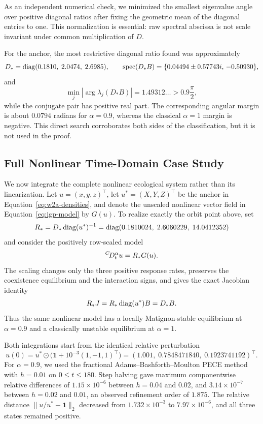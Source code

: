 As an independent numerical check, we minimized the smallest eigenvalue angle over positive diagonal ratios after fixing the geometric mean of the diagonal entries to one. This normalization is essential: raw spectral abscissa is not scale invariant under common multiplication of \(D\).

For the anchor, the most restrictive diagonal ratio found was approximately
\[
 D_*=\operatorname{diag}(0.1810,\;2.0474,\;2.6985),
 \qquad
 \operatorname{spec}(D_*B)=\{0.04494\pm0.57743i,\,-0.50930\},
\]
and
\[
 \min_j|\arg\lambda_j(D_*B)|=1.49312\ldots>0.9\frac{\pi}{2},
\]
while the conjugate pair has positive real part. The corresponding angular margin is about \(0.0794\) radians for \(\alpha=0.9\), whereas the classical \(\alpha=1\) margin is negative. This direct search corroborates both sides of the classification, but it is not used in the proof.

\subsection{Full Nonlinear Time-Domain Case Study}

We now integrate the complete nonlinear ecological system rather than its linearization. Let \(u=(x,y,z)^\top\), let \(u^*=(X,Y,Z)^\top\) be the anchor in Equation~\eqref{eq:w2a-densities}, and denote the unscaled nonlinear vector field in Equation~\eqref{eq:igp-model} by \(G(u)\). To realize exactly the orbit point above, set
\begin{equation}
 R_*=D_*\operatorname{diag}(u^*)^{-1}
 =\operatorname{diag}(0.1810024,\;2.6060229,\;14.0412352)
 \label{eq:row-rate-scaling}
\end{equation}
and consider the positively row-scaled model
\begin{equation}
 {}^{C}\!D_t^{\alpha}u=R_*G(u).
 \label{eq:scaled-nonlinear-case}
\end{equation}
The scaling changes only the three positive response rates, preserves the coexistence equilibrium and the interaction signs, and gives the exact Jacobian identity
\[
 R_*J=R_*\operatorname{diag}(u^*)B=D_*B.
\]
Thus the same nonlinear model has a locally Matignon-stable equilibrium at \(\alpha=0.9\) and a classically unstable equilibrium at \(\alpha=1\).

Both integrations start from the identical relative perturbation
\[
 u(0)=u^*\odot\bigl(\mathbf 1+10^{-3}(1,-1,1)^\top\bigr)
      =(1.001,\;0.7848471840,\;0.1923741192)^\top.
\]
For \(\alpha=0.9\), we used the fractional Adams--Bashforth--Moulton PECE method \cite{Garrappa2010,Garrappa2018,Diethelm2010} with \(h=0.01\) on \(0\le t\le180\). Step halving gave maximum componentwise relative differences of \(1.15\times10^{-6}\) between \(h=0.04\) and \(0.02\), and \(3.14\times10^{-7}\) between \(h=0.02\) and \(0.01\), an observed refinement order of \(1.875\). The relative distance \(\|u/u^*-\mathbf 1\|_2\) decreased from \(1.732\times10^{-3}\) to \(7.97\times10^{-6}\), and all three states remained positive.

